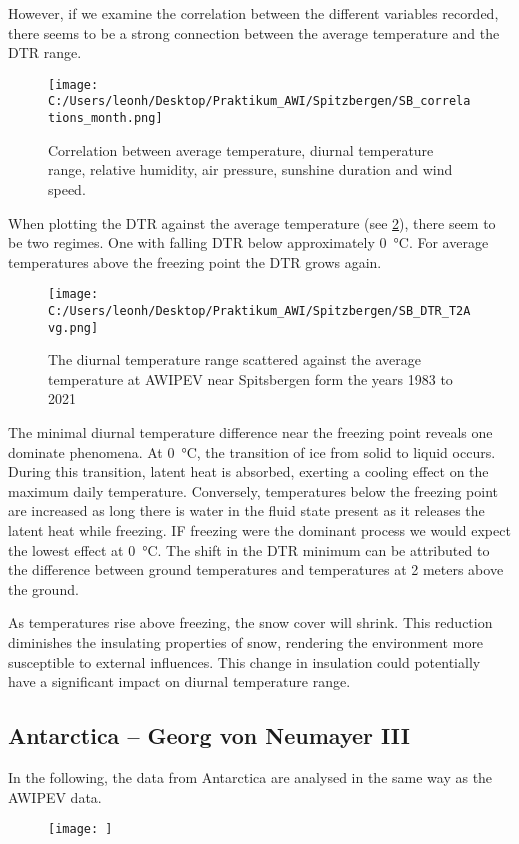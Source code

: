 However, if we examine the correlation between the different variables recorded, there seems to be a strong connection between the average temperature and the DTR range.

\begin{figure}[ht]
    \centering
    \texttt{[image: C:/Users/leonh/Desktop/Praktikum\_AWI/Spitzbergen/SB\_correlations\_month.png]}
    \caption{Correlation between average temperature, diurnal temperature range, relative humidity, air pressure, sunshine duration and wind speed.}
    \label{fi:correlationMonth_SB}
\end{figure}

When plotting the DTR against the average temperature (see \cref{fig:SB_DTR_Month_scatterd}), there seem to be two regimes. One with falling DTR below approximately 
\SI{0}{\celsius}. For average temperatures above the freezing point the DTR grows again. 

\begin{figure}[h!]
    \centering
    \texttt{[image: C:/Users/leonh/Desktop/Praktikum\_AWI/Spitzbergen/SB\_DTR\_T2Avg.png]}
    \caption[short]{The diurnal temperature range scattered against the average temperature at AWIPEV near Spitsbergen form the years 1983 to 2021}
    \label{fig:SB_DTR_Month_scatterd}
\end{figure}

The minimal diurnal temperature difference near the freezing point reveals one dominate
phenomena. At \SI{0}{\celsius}, the transition of ice from solid to liquid occurs. During this transition, latent heat is absorbed, exerting a cooling effect on the maximum daily temperature. Conversely, temperatures below the freezing point are increased as long there is water in the fluid state present as it releases the latent heat while freezing. IF freezing were the dominant process we would expect the lowest effect at \SI{0}{\celsius}.
The shift in the DTR minimum can be attributed to the difference between ground temperatures and temperatures at 2 meters above the ground.

As temperatures rise above freezing, the snow cover will shrink. This reduction diminishes the insulating properties of snow, rendering the environment more susceptible to external influences. This change in insulation could potentially have a significant impact on diurnal temperature range.



\subsection*{Antarctica -- Georg von Neumayer III}

In the following, the data from Antarctica are analysed in the same way as the AWIPEV data.

\begin{figure}[ht]
    \centering
    \texttt{[image: ]}
\end{figure}
